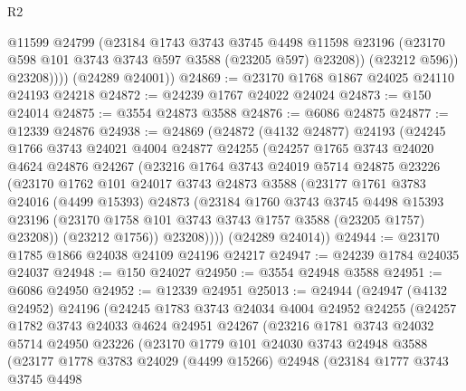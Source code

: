 \begin{lexlean}{R2}
\begin{coremodule}
                @11599
                @24799
                (@23184
                  @1743
                  @3743
                  @3745
                  @4498
                  @11598
                  @23196
                  (@23170 @598 @101 @3743 @3743 @597 @3588 (@23205 @597) @23208))
                (@23212 @596))
              @23208))))
      (@24289 @24001))
@24869 := @23170 @1768 @1867 @24025 @24110 @24193 @24218
@24872 := @24239 @1767 @24022 @24024
@24873 := @150 @24014
@24875 := @3554 @24873 @3588
@24876 := @6086 @24875
@24877 := @12339 @24876
@24938 := @24869
    (@24872
      (@4132 @24877)
      @24193
      (@24245
        @1766
        @3743
        @24021
        @4004
        @24877
        @24255
        (@24257
          @1765
          @3743
          @24020
          @4624
          @24876
          @24267
          (@23216
            @1764
            @3743
            @24019
            @5714
            @24875
            @23226
            (@23170
              @1762
              @101
              @24017
              @3743
              @24873
              @3588
              (@23177
                @1761
                @3783
                @24016
                (@4499 @15393)
                @24873
                (@23184
                  @1760
                  @3743
                  @3745
                  @4498
                  @15393
                  @23196
                  (@23170 @1758 @101 @3743 @3743 @1757 @3588 (@23205 @1757) @23208))
                (@23212 @1756))
              @23208))))
      (@24289 @24014))
@24944 := @23170 @1785 @1866 @24038 @24109 @24196 @24217
@24947 := @24239 @1784 @24035 @24037
@24948 := @150 @24027
@24950 := @3554 @24948 @3588
@24951 := @6086 @24950
@24952 := @12339 @24951
@25013 := @24944
    (@24947
      (@4132 @24952)
      @24196
      (@24245
        @1783
        @3743
        @24034
        @4004
        @24952
        @24255
        (@24257
          @1782
          @3743
          @24033
          @4624
          @24951
          @24267
          (@23216
            @1781
            @3743
            @24032
            @5714
            @24950
            @23226
            (@23170
              @1779
              @101
              @24030
              @3743
              @24948
              @3588
              (@23177
                @1778
                @3783
                @24029
                (@4499 @15266)
                @24948
                (@23184
                  @1777
                  @3743
                  @3745
                  @4498

\end{coremodule}
\end{lexlean}
